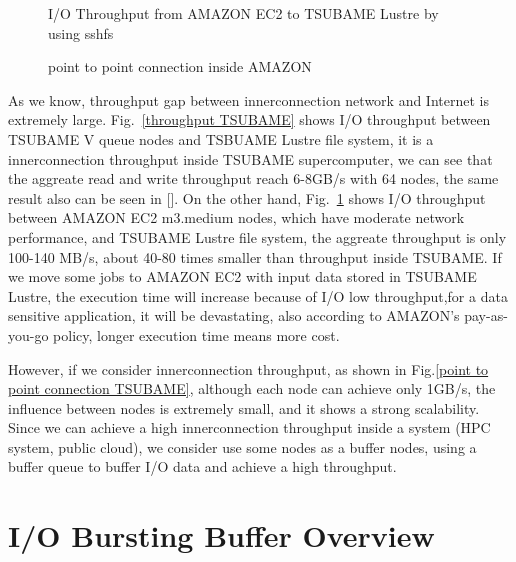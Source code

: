 \documentclass[JIP,draft]{ipsj}
\begin{document}
\begin{figure}[tb]
	\centering
	\caption{I/O Throughput from AMAZON EC2 to TSUBAME Lustre by using sshfs}
	\label{throughput AMAZON to TSUBAME Lustre}
\end{figure}

\begin{figure}[tb]
	\centering
	\caption{point to point connection inside AMAZON}
	\label{point to point connection AMAZON}
\end{figure} 
As we know, throughput gap between innerconnection network and Internet is extremely large.
Fig.~\ref{throughput TSUBAME} shows I/O throughput between TSUBAME V queue nodes and TSBUAME Lustre file system, it is a innerconnection throughput inside TSUBAME supercomputer, we can see that the aggreate read and write throughput reach 6-8GB/s with 64 nodes, the same result also can be seen in [].
On the other hand, Fig.~\ref{throughput AMAZON to TSUBAME Lustre} shows I/O throughput between AMAZON EC2 m3.medium nodes, which have moderate network performance, and TSUBAME Lustre file system, the aggreate throughput is only 100-140 MB/s, about 40-80 times smaller than throughput inside TSUBAME.
If we move some jobs to AMAZON EC2 with input data stored in TSUBAME Lustre, the execution time will increase because of I/O low throughput,for a data sensitive application, it will be devastating, also according to AMAZON's pay-as-you-go policy, longer execution time means more cost.

However, if we consider innerconnection throughput, as shown in Fig.\ref{point to point connection TSUBAME}, although each node can achieve only 1GB/s, the influence between nodes is extremely small, and it shows a strong scalability.
Since we can achieve a high innerconnection throughput inside a system (HPC system, public cloud), we consider use some nodes as a buffer nodes, using a buffer queue to buffer I/O data and achieve a high throughput.

\section{I/O Bursting Buffer Overview}
\end{document}
